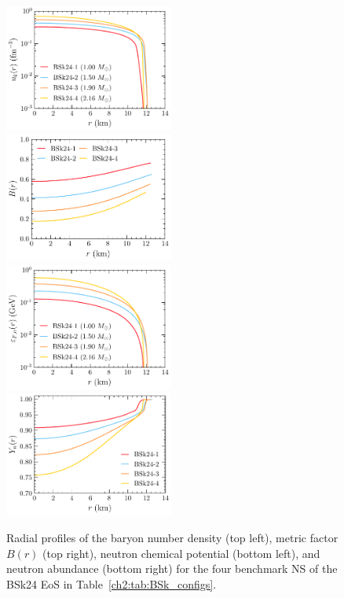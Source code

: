 \begin{figure}[t!bp]
    \centering
    \includegraphics[width=0.495\textwidth]{nb_BSk_prof.pdf}
    \includegraphics[width=0.495\textwidth]{B_BSk_prof.pdf}
    \includegraphics[width=0.495\textwidth]{epsFn_BSk_prof.pdf}
    \includegraphics[width=0.495\textwidth]{Yn_BSk_prof.pdf}
    \caption{Radial profiles of the baryon number density (top left), metric factor $B(r)$ (top right), neutron chemical potential (bottom left), and neutron abundance (bottom right) for the four benchmark NS of the BSk24 EoS in Table~\ref{ch2:tab:BSk_configs}.}
    \label{ch2:fig:BSk_profiles}
\end{figure}
    

